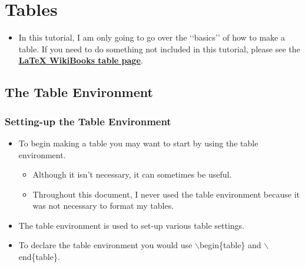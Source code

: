 \section{Tables}
	\begin{itemize}
		\item In this tutorial, I am only going to go over the \lq\lq{}basics\rq\rq{} of how to make a table. If you need to do something not included in this tutorial, please see the \href{https://en.wikibooks.org/wiki/LaTeX/Tables}{\textbf{\LaTeX{} WikiBooks table page}}.
	\end{itemize}
	\subsection{The Table Environment}
		\subsubsection{Setting-up the Table Environment}
			\begin{itemize}
				\item To begin making a table you may want to start by using the table environment. 
				\begin{itemize}
					\item Although it isn\rq{}t necessary, it can sometimes be useful.
					\item Throughout this document, I never used the table environment because it was not necessary to format my tables.
				\end{itemize}
				\item The table environment is used to set-up various table settings.
				\item To declare the table environment you would use $\backslash$begin\{table\} and $\backslash$end\{table\}.	
			\end{itemize}
			
